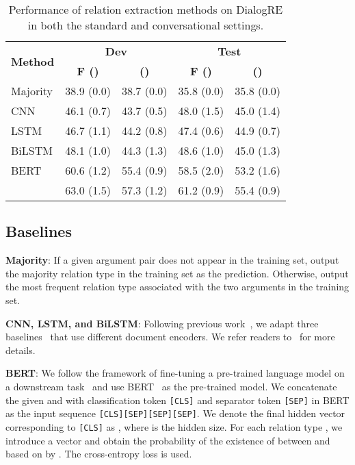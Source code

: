 \documentclass[11pt,a4paper]{article}
\begin{document}
\begin{table*}[t]
\centering
\footnotesize
\begin{tabular}{lcc|cc}
\toprule
\multirow{2}{*}{\bf Method}          & \multicolumn{2}{c|}{\bf Dev} & \multicolumn{2}{c}{\bf Test} \\
                                      & \bf F ()      & \bf  ()  & \bf F ()  & \bf  ()   \\
\midrule
Majority   & 38.9 (0.0) &  38.7 (0.0) &  35.8 (0.0) & 35.8 (0.0) \\
CNN          & 46.1 (0.7)  & 43.7 (0.5)    & 48.0 (1.5)   & 45.0 (1.4)  \\
LSTM         & 46.7 (1.1)  & 44.2 (0.8)     & 47.4 (0.6)  & 44.9 (0.7)    \\
BiLSTM      &  48.1 (1.0)   & 44.3 (1.3)     & 48.6 (1.0)  & 45.0 (1.3)    \\
BERT &    60.6 (1.2)  & 55.4 (0.9)      & 58.5 (2.0)  & 53.2 (1.6) \\  
  &  63.0 (1.5)    & 57.3 (1.2)    & 61.2 (0.9) & 55.4 (0.9) \\ 
\bottomrule
\end{tabular}
\caption{Performance of relation extraction methods on DialogRE in both the standard and conversational settings.} \label{tab:big_table}
\end{table*}






\subsection{Baselines}
\label{sec:sec:baselines}

\noindent \textbf{Majority}: If a given argument pair does not appear in the training set, output the majority relation type in the training set as the prediction. Otherwise, output the most frequent relation type associated with the two arguments in the training set.

\medskip


\noindent \textbf{CNN, LSTM, and BiLSTM}: Following previous work~\cite{yao2019docred}, we adapt three baselines~\cite{zeng2014relation,cai2016bidirectional} that use different document encoders. We refer readers to~ for more details.

\medskip

\noindent \textbf{BERT}: We follow the framework of fine-tuning a pre-trained language model on a downstream task~\cite{radfordimproving} and use BERT~\cite{bert2018} as the pre-trained model. We concatenate the given  and  with classification token \texttt{[CLS]} and separator token \texttt{[SEP]} in BERT as the input sequence  \texttt{[CLS]}\texttt{[SEP]}\texttt{[SEP]}\texttt{[SEP]}. We denote the final hidden vector corresponding to \texttt{[CLS]} as , where  is the hidden size. For each relation type , we introduce a vector  and obtain the probability  of the existence of  between  and  based on  by . The cross-entropy loss is used. 
\end{document}

